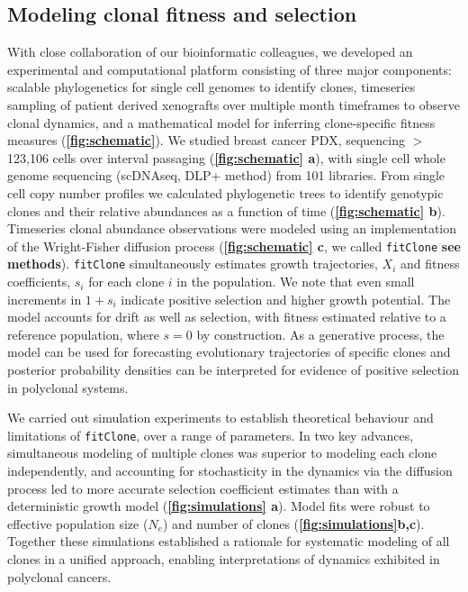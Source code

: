 \subsection{Modeling clonal fitness and selection}
With close collaboration of our bioinformatic colleagues, we  developed an experimental and computational platform consisting of three major components: scalable phylogenetics for single cell genomes to identify clones, timeseries sampling of patient derived xenografts over multiple month timeframes to observe clonal dynamics, and a mathematical model for inferring clone-specific fitness measures (\textbf{\autoref{fig:schematic}}). We studied breast cancer PDX, sequencing $>$123,106 cells over interval passaging (\textbf{\autoref{fig:schematic} a}), with single cell whole genome sequencing\cite{laks2019clonal} (scDNAseq, DLP+ method) from 101 libraries. From single cell copy number profiles we calculated phylogenetic trees to identify genotypic clones and their relative abundances as a function of time (\textbf{\autoref{fig:schematic} b}).
Timeseries clonal abundance observations were modeled using an implementation of the Wright-Fisher diffusion process  (\textbf{\autoref{fig:schematic} c}, we called \texttt{fitClone} \textbf{see methods}). \texttt{fitClone} simultaneously estimates growth trajectories, $X_i$ and fitness coefficients, $s_i$ for each clone $i$ in the population. 
We note that even small increments in $1+s_i$ indicate positive selection and higher growth potential. The model accounts for drift as well as selection, with fitness estimated relative to a reference population, where $s=0$ by construction. As a generative process, the model can be used for forecasting evolutionary trajectories of specific clones and posterior probability densities can be interpreted for evidence of positive selection in polyclonal systems. 

We carried out simulation experiments to establish theoretical behaviour and limitations of \texttt{fitClone}, over a range of parameters.  In two key advances, simultaneous modeling of multiple clones was superior to modeling each clone independently, and accounting for stochasticity in the dynamics via the diffusion process led to more accurate selection coefficient estimates than with a deterministic growth model (\textbf{\autoref{fig:simulations} a}). Model fits were robust to effective population size ($N_e$) and number of clones (\textbf{\autoref{fig:simulations}b,c}). Together these simulations established a rationale for systematic modeling of all clones in a unified approach, enabling  interpretations of dynamics exhibited in polyclonal cancers.

